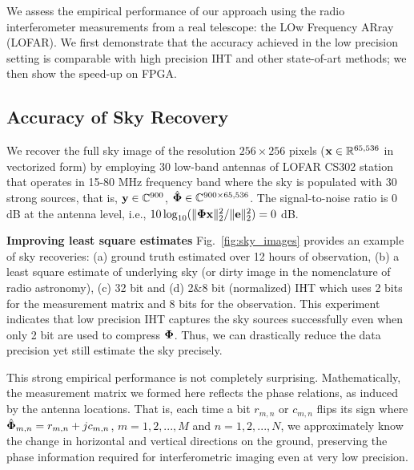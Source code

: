 \documentclass{article}
\begin{document}
{We assess the empirical performance of our approach using the radio interferometer measurements from a real telescope: the LOw Frequency ARray (LOFAR). We first demonstrate that the accuracy achieved in the low precision setting is comparable with high precision IHT and other state-of-art methods; we then show the speed-up on FPGA.

\subsection{Accuracy of Sky Recovery}

We recover the full sky image of the resolution $256\times 256$ pixels (${\bf x} \in \mathbb{R}^{65,536}$ in vectorized form) by employing 30 low-band antennas of LOFAR CS302 station that operates in 15-80 MHz frequency band where the sky is populated with 30 strong sources, that is, ${\bf y} \in \mathbb{C}^{900}$, $\hat{\bf \Phi} \in \mathbb{C}^{900\times 65,536}$. The signal-to-noise ratio is 0 dB at the antenna level, i.e., $10\log_{10}(\|{\bf \Phi x}\|_2^2/\|{\bf e}\|_2^2) = 0$ dB. 

{\bf Improving least square estimates}
Fig.~\ref{fig:sky_images} provides an example of sky recoveries: (a) ground truth estimated over 12 hours of observation, (b) a least square estimate of underlying sky (or dirty image in the nomenclature of radio astronomy), (c) 32 bit and (d) 2\&8 bit (normalized) IHT which uses 2 bits for the measurement matrix and 8 bits for the observation. This experiment indicates that low precision IHT captures the sky sources successfully even when only 2 bit are used to compress ${\bf \Phi}$. Thus, we can drastically reduce the data precision yet still estimate the sky precisely.

This strong empirical performance is not completely surprising. Mathematically, the measurement matrix we formed here reflects the phase relations, as induced by the antenna locations.  That is, each time a bit $r_{m, n}$ or $c_{m, n}$ flips its sign where $\hat{\bf \Phi}_{m, n} = r_{m, n} +j c_{m,n}$, $m = {1, 2, ..., M}$ and $n = {1, 2, ..., N}$, we approximately know the change in horizontal and vertical directions on the ground, preserving the phase information required for interferometric imaging even at very low precision.

}
\end{document}
